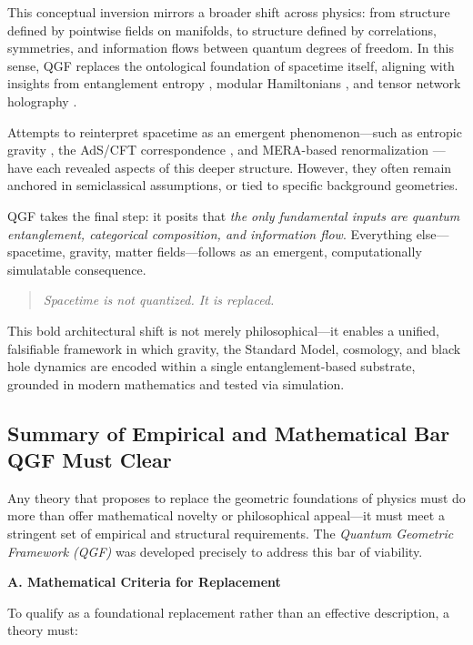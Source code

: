 \documentclass[11pt]{article}
\begin{document}
This conceptual inversion mirrors a broader shift across physics: from structure defined by pointwise fields on manifolds, to structure defined by correlations, symmetries, and information flows between quantum degrees of freedom. In this sense, QGF replaces the ontological foundation of spacetime itself, aligning with insights from entanglement entropy \cite{Ryu2006}, modular Hamiltonians \cite{Bisognano1976}, and tensor network holography \cite{Swingle2012}.

Attempts to reinterpret spacetime as an emergent phenomenon—such as entropic gravity \cite{Jacobson1995}, the AdS/CFT correspondence \cite{Maldacena1998}, and MERA-based renormalization \cite{Evenbly2011}—have each revealed aspects of this deeper structure. However, they often remain anchored in semiclassical assumptions, or tied to specific background geometries.

QGF takes the final step: it posits that \textit{the only fundamental inputs are quantum entanglement, categorical composition, and information flow}. Everything else—spacetime, gravity, matter fields—follows as an emergent, computationally simulatable consequence.

\vspace{1em}
\begin{quote}
\textit{Spacetime is not quantized. It is replaced.}
\end{quote}

This bold architectural shift is not merely philosophical—it enables a unified, falsifiable framework in which gravity, the Standard Model, cosmology, and black hole dynamics are encoded within a single entanglement-based substrate, grounded in modern mathematics and tested via simulation.

\subsection{Summary of Empirical and Mathematical Bar QGF Must Clear}

Any theory that proposes to replace the geometric foundations of physics must do more than offer mathematical novelty or philosophical appeal—it must meet a stringent set of empirical and structural requirements. The \textit{Quantum Geometric Framework (QGF)} was developed precisely to address this bar of viability.

\vspace{0.8em}
\noindent\textbf{A. Mathematical Criteria for Replacement}

To qualify as a foundational replacement rather than an effective description, a theory must:
\end{document}
